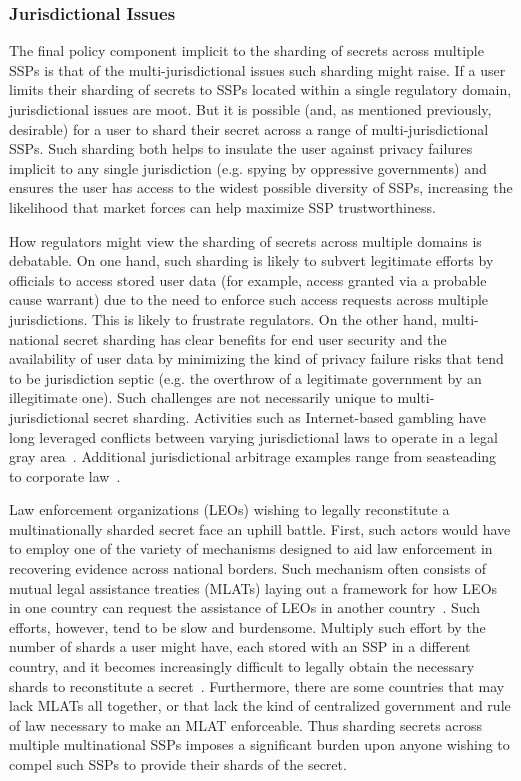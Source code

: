 \subsubsection{Jurisdictional Issues}
\label{chap:policy:trust:jurisdiction}

The final policy component implicit to the sharding of secrets across
multiple SSPs is that of the multi-jurisdictional issues such sharding
might raise. If a user limits their sharding of secrets to SSPs
located within a single regulatory domain, jurisdictional issues are
moot. But it is possible (and, as mentioned previously, desirable) for
a user to shard their secret across a range of multi-jurisdictional
SSPs. Such sharding both helps to insulate the user against privacy
failures implicit to any single jurisdiction (e.g. spying by
oppressive governments) and ensures the user has access to the widest
possible diversity of SSPs, increasing the likelihood that market
forces can help maximize SSP trustworthiness.

How regulators might view the sharding of secrets across multiple
domains is debatable. On one hand, such sharding is likely to subvert
legitimate efforts by officials to access stored user data (for
example, access granted via a probable cause warrant) due to the need
to enforce such access requests across multiple jurisdictions. This is
likely to frustrate regulators. On the other hand, multi-national
secret sharding has clear benefits for end user security and the
availability of user data by minimizing the kind of privacy failure
risks that tend to be jurisdiction septic (e.g.  the overthrow of a
legitimate government by an illegitimate one). Such challenges are not
necessarily unique to multi-jurisdictional secret sharding. Activities
such as Internet-based gambling have long leveraged conflicts between
varying jurisdictional laws to operate in a legal gray
area~\cite{miller2006}. Additional jurisdictional arbitrage examples
range from seasteading~\cite{balloun2012} to corporate
law~\cite{kocaoglu2008}.

Law enforcement organizations (LEOs) wishing to legally reconstitute a
multinationally sharded secret face an uphill battle. First, such
actors would have to employ one of the variety of mechanisms designed
to aid law enforcement in recovering evidence across national
borders. Such mechanism often consists of mutual legal assistance
treaties (MLATs) laying out a framework for how LEOs in one country
can request the assistance of LEOs in another
country~\cite{stigall2013, walden2011}. Such efforts, however, tend to
be slow and burdensome. Multiply such effort by the number of shards a
user might have, each stored with an SSP in a different country, and
it becomes increasingly difficult to legally obtain the necessary
shards to reconstitute a secret~\cite{kent2015}. Furthermore, there
are some countries that may lack MLATs all together, or that lack the
kind of centralized government and rule of law necessary to make an
MLAT enforceable. Thus sharding secrets across multiple multinational
SSPs imposes a significant burden upon anyone wishing to compel such
SSPs to provide their shards of the secret.

